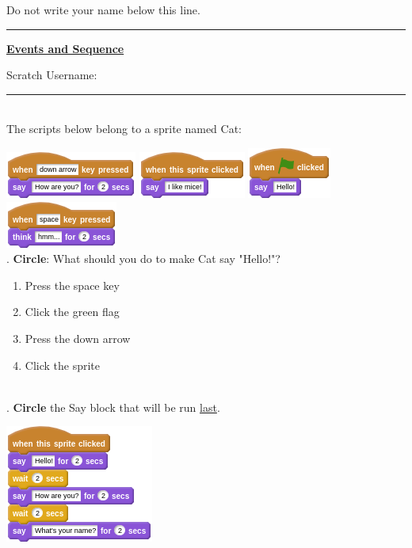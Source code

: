 \documentclass[letterpaper,12pt]{article}
\begin{document}
\noindent Do not write your name below this line. \\
\noindent \hrule
\begin{center}
{\Large \textbf{\underline{Events and Sequence}}}
\end{center}
Scratch Username: \rule{4cm}{0.4pt}

\noindent \dotfill \\

\noindent The scripts below belong to a sprite named Cat:

\includegraphics[scale=.7]{q1_script0.png} \hspace{1cm}
\includegraphics[scale=.7]{q1_script1.png} \hspace{1cm}
\includegraphics[scale=.7]{q1_script2.png} \hspace{1cm}
\includegraphics[scale=.7]{q1_script3.png} \hspace{1cm} \\

. \textbf{Circle}: What should you do to make Cat say "Hello!"?
\renewcommand{\theenumi}{\Alph{enumi}}
\begin{enumerate}
\item Press the space key
\item Click the green flag
\item Press the down arrow
\item Click the sprite
\end{enumerate}

\noindent \dotfill \\

. \textbf{Circle} the Say block that will be run \underline{last}.  \\
\begin{center}
\includegraphics[scale=.7]{q2_script0.png}
\end{center}
\end{document}
